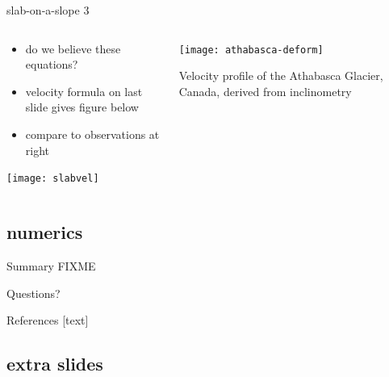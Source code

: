 \documentclass[10pt]{beamer}
\begin{document}
\begin{frame}{slab-on-a-slope 3}

\begin{columns}
\begin{column}{0.6\textwidth}
\begin{itemize}
\item do we believe these equations?
\item velocity formula on last slide gives figure below
\item compare to observations at right
\end{itemize}
\begin{center}
\texttt{[image: slabvel]}
\end{center}
\end{column}

\begin{column}{0.4\textwidth}
\texttt{[image: athabasca-deform]}

\medskip
\scriptsize
Velocity profile of the Athabasca Glacier, Canada, derived from inclinometry \cite{SavagePaterson1963}
\end{column}
\end{columns}
\end{frame}


\subsection{numerics}

\begin{frame}{Summary}
FIXME
\end{frame}

\begin{frame}[standout]
  Questions?
\end{frame}

\appendix


\begin{frame}[allowframebreaks]{References}
[text]

  
  
\end{frame}


\subsection[]{extra slides}
\end{document}
